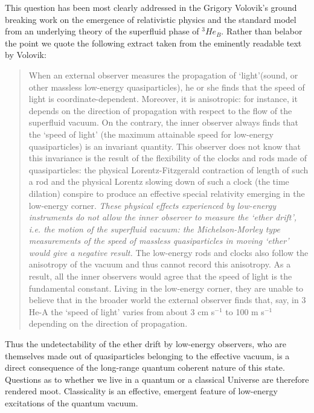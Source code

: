 \begin{doublespace}
This question has been most clearly addressed in the Grigory Volovik's ground breaking work on the emergence of relativistic physics and the standard model from an underlying theory of the superfluid phase of $ {}^3 He_B $. Rather than belabor the point we quote the following extract taken from the eminently readable text \cite{Volovik2006The-Universe} by Volovik:

\begin{singlespace}
\begin{quote}
When an external observer measures the propagation of `light'(sound, or other massless low-energy quasiparticles), he or she finds that the speed of light is coordinate-dependent. Moreover, it is anisotropic: for instance, it depends on the direction of propagation with respect to the ﬂow of the superﬂuid vacuum. On the contrary, the inner observer always finds that the `speed of light' (the maximum attainable speed for low-energy quasiparticles) is an invariant quantity. This observer does not know that this invariance is the result of the flexibility of the clocks and rods made of quasiparticles: the physical Lorentz-Fitzgerald contraction of length of such a rod and the physical Lorentz slowing down of such a clock (the time dilation) conspire to produce an effective special relativity emerging in the low-energy corner. \emph{These physical eﬀects experienced by low-energy instruments do not allow the inner observer to measure the `ether drift’, i.e. the motion of the superfluid vacuum: the Michelson-Morley type measurements of the speed of massless quasiparticles in moving `ether' would give a negative result.} The low-energy rods and clocks also follow the anisotropy of the vacuum and thus cannot record this anisotropy. As a result, all the inner observers would agree that the speed of light is the fundamental constant. Living in the low-energy corner, they are unable to believe that in the broader world the external observer finds that, say, in 3 He-A the `speed of light' 	varies from about 3 cm s${}^{-1}$ to 100 m s${}^{-1}$ depending on the direction of propagation.
\end{quote}
\end{singlespace}

Thus the undetectability of the ether drift by low-energy observers, who are themselves made out of quasiparticles belonging to the effective vacuum, is a direct consequence of the long-range quantum coherent nature of this state. Questions as to whether we live in a quantum or a classical Universe are therefore rendered moot. Classicality is an effective, emergent feature of low-energy excitations of the quantum vacuum.


\end{doublespace}
